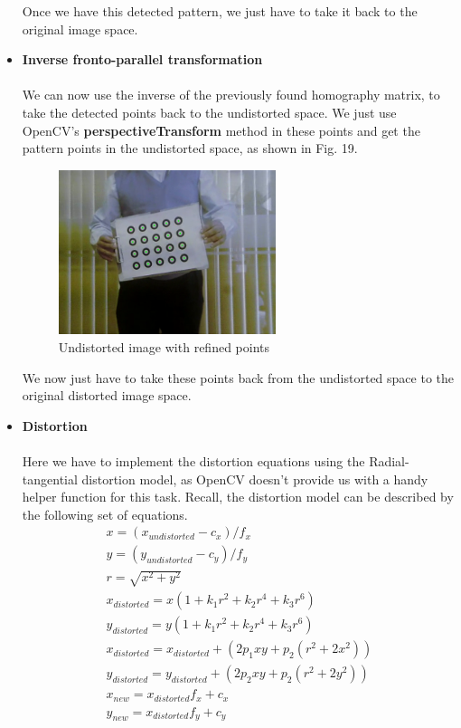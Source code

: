 \documentclass[journal]{IEEEtran}
\begin{document}
\begin{itemize}
        Once we have this detected pattern, we just have to take it back to the original image space.
        \\

    \item \textbf{Inverse fronto-parallel transformation}
        \\
        \\
        We can now use the inverse of the previously found homography matrix, to take the detected points back to the undistorted space. We just use OpenCV's \textbf{perspectiveTransform} method in these points and get the pattern points in the undistorted space, as shown in Fig. 19.

        \begin{figure}[H]
        \centering
        \includegraphics[width=2.5in]{_img/report_4/img_refinement_inverse_perspective.png}
        \caption{Undistorted image with refined points}
        \end{figure}

        We now just have to take these points back from the undistorted space to the original distorted image space.
        \\

    \item \textbf{Distortion}
        \\
        \\
        Here we have to implement the distortion equations using the Radial-tangential distortion model, as OpenCV doesn't provide us with a handy helper function for this task. Recall, the distortion model can be described by the following set of equations.
        \begin{gather*}
            x = ( x_{undistorted} - c_{x} ) / f_{x}\\
            y = ( y_{undistorted} - c_{y} ) / f_{y}\\
            r = \sqrt{ x^{2} + y^{2} } \\
            x_{distorted} = x ( 1 + k_{1} r^{2} + k_{2} r^{4} + k_{3} r^{6} )\\
            y_{distorted} = y ( 1 + k_{1} r^{2} + k_{2} r^{4} + k_{3} r^{6} )\\
            x_{distorted} = x_{distorted} + ( 2 p_{1} x y + p_{2} ( r^{2} + 2 x^{2} ) )\\
            y_{distorted} = y_{distorted} + ( 2 p_{2} x y + p_{2} ( r^{2} + 2 y^{2} ) )\\
            x_{new} = x_{distorted} f_{x} + c_{x}\\
            y_{new} = x_{distorted} f_{y} + c_{y}\\
        \end{gather*}


\end{itemize}
\end{document}
